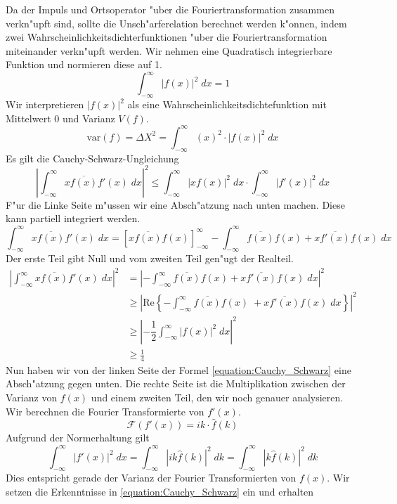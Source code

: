 \begin{refsection}
Da der Impuls und Ortsoperator "uber die Fouriertransformation zusammen verkn"upft sind, sollte die Unsch"arferelation berechnet werden k"onnen, indem zwei Wahrscheinlichkeitsdichterfunktionen "uber die Fouriertransformation miteinander verkn"upft werden.
Wir nehmen eine Quadratisch integrierbare Funktion und normieren diese auf 1.
\begin{equation}
	\int_{-\infty}^{\infty} |f(x)|^{2} \; dx = 1
\end{equation}
Wir interpretieren $|f(x)|^{2}$ als eine Wahrscheinlichkeitsdichtefunktion mit Mittelwert 0 und Varianz $V(f)$.
\begin{equation}	
	\text{var}(f) = \varDelta X^{2} = \int_{-\infty}^{\infty} (x)^{2} \cdot |f(x)|^{2} \; dx
	\label{equation:varianz1.0}
\end{equation}
Es gilt die Cauchy-Schwarz-Ungleichung
\begin{equation}	
	\left| \int_{-\infty}^{\infty} x \overline{f(x)}  f'(x) \; dx\right|^{2} \leq  \int_{-\infty}^{\infty} \left| x f(x)\right|^{2}\; dx \cdot \int_{-\infty}^{\infty} \left| f'(x)\right|^{2}\; dx
	\label{equation:Cauchy_Schwarz}
\end{equation}
F"ur die Linke Seite m"ussen wir eine Absch"atzung nach unten machen.
Diese kann partiell integriert werden.
\begin{equation}	
	\int_{-\infty}^{\infty} x \overline{f(x)}  f'(x) \; dx = \left[ x \overline{f(x)}f(x) \right]_{-\infty}^{\infty}-  \int_{-\infty}^{\infty} \overline{f(x)}f(x) +  x \overline{f'(x)}  f(x)\; dx
\end{equation} 
Der erste Teil gibt Null und vom zweiten Teil gen"ugt der Realteil.
\begin{align}	
\left| \int_{-\infty}^{\infty} x \overline{f(x)}  f'(x) \; dx\right|^{2}
&= \left| -  \int_{-\infty}^{\infty} \overline{f(x)}f(x) +  x \overline{f'(x)}  f(x)\; dx\right| ^{2}\\
&\geq \left| \text{Re}\left\lbrace -\int_{-\infty}^{\infty} \overline{f(x)}f(x)\; +  x \overline{f'(x)}  f(x)\; dx \right\rbrace\right|^{2}\\
&\geq\left| -\dfrac{1}{2} \int_{-\infty}^{\infty} \left| f(x)\right|^{2}\; dx \right|^{2}\\
&\geq \frac{1}{4}
\end{align}
Nun haben wir von der linken Seite der Formel \ref{equation:Cauchy_Schwarz} eine Absch"atzung gegen unten.
Die rechte Seite ist die Multiplikation zwischen der Varianz von $f(x)$ und einem zweiten Teil, den wir noch genauer analysieren.
Wir berechnen die Fourier Transformierte von $f'(x)$.
\begin{equation}	
\mathcal{F}(f'(x)) = ik \cdot \hat{f}(k)
\end{equation}
Aufgrund der Normerhaltung gilt
\begin{equation}	
\int_{-\infty}^{\infty} \left| f'(x)\right|^{2}\; dx = \int_{-\infty}^{\infty} \left| ik \hat{f}(k)\right|^{2}\; dk= \int_{-\infty}^{\infty} \left| k \hat{f}(k)\right|^{2}\; dk
\end{equation}
Dies entspricht gerade der Varianz der Fourier Transformierten von $f(x)$. Wir setzen die Erkenntnisse in \ref{equation:Cauchy_Schwarz} ein und erhalten


\end{refsection}
